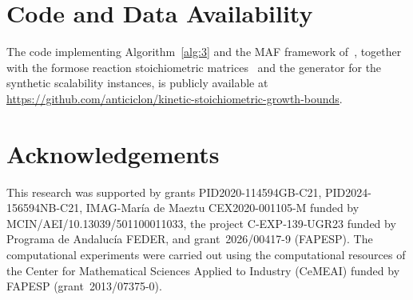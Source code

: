 \documentclass[a4paper,11pt,reqno]{amsart}
\begin{document}
\section*{Code and Data Availability}
The code implementing Algorithm~\ref{alg:3} and the MAF framework
of~\citet{gonzalez2024maf}, together with the formose reaction stoichiometric
matrices~\citep{muller2022formose} and the generator for the synthetic
scalability instances, is publicly available at
\url{https://github.com/anticiclon/kinetic-stoichiometric-growth-bounds}.

\section*{Acknowledgements}
This research was supported by grants PID2020-114594GB-C21, PID2024-156594NB-C21, IMAG-Mar\'ia de Maeztu CEX2020-001105-M funded by MCIN/AEI/10.13039/501100011033, the project C‐EXP‐139‐UGR23 funded by Programa de Andaluc\'ia FEDER, and grant~2026/00417-9
(FAPESP). The computational experiments were carried 
out using the computational resources of the Center for 
Mathematical Sciences Applied to Industry (CeMEAI) funded by 
FAPESP (grant~2013/07375-0).

%
% 
% 
\end{document}
